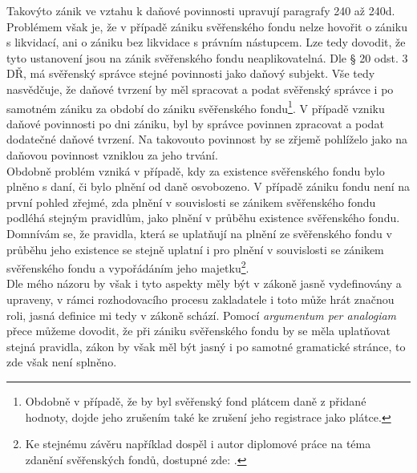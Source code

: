 \documentclass{article}
\begin{document}
Takovýto zánik ve vztahu k daňové povinnosti upravují paragrafy 240 až 240d. Problémem však je, že v případě zániku svěřenského fondu nelze hovořit o zániku s likvidací, ani o zániku bez likvidace s právním nástupcem. Lze tedy dovodit, že tyto ustanovení jsou na zánik svěřenského fondu neaplikovatelná. Dle § 20 odst. 3 DŘ, má svěřenský správce stejné povinnosti jako daňový subjekt. Vše tedy nasvědčuje, že daňové tvrzení by měl spracovat a podat svěřenský správce i po samotném zániku za období do zániku svěřenského fondu\footnote{Obdobně v případě, že by byl svěřenský fond plátcem daně z přidané hodnoty, dojde jeho zrušením také ke zrušení jeho registrace jako plátce.}. V případě vzniku daňové povinnosti po dni zániku, byl by správce povinnen zpracovat a podat dodatečné daňové tvrzení. Na takovouto povinnost by se zřjemě pohlíželo jako na daňovou povinnost vzniklou za jeho trvání.\\

Obdobně problém vzniká v případě, kdy za existence svěřenského fondu bylo plněno s daní, či bylo plnění od daně osvobozeno. V případě zániku fondu není na první pohled zřejmé, zda plnění v souvislosti se zánikem svěřenského fondu podléhá stejným pravidlům, jako plnění v průběhu existence svěřenského fondu.\\

Domnívám se, že pravidla, která se uplatňují na plnění ze svěřenského fondu v průběhu jeho existence se stejně uplatní i pro plnění v souvislosti se zánikem svěřenského fondu a vypořádáním jeho majetku\footnote{Ke stejnému závěru například dospěl i autor diplomové práce na téma zdanění svěřenských fondů, dostupné zde: .}.\\

Dle mého názoru by však i tyto aspekty měly být v zákoně jasně vydefinovány a upraveny, v rámci rozhodovacího procesu zakladatele i toto může hrát značnou roli, jasná definice mi tedy v zákoně schází. Pomocí \textit{argumentum per analogiam} přece můžeme dovodit, že při zániku svěřenského fondu by se měla uplatňovat stejná pravidla, zákon by však měl být jasný i po samotné gramatické stránce, to zde však není splněno.\\


 
\end{document}
